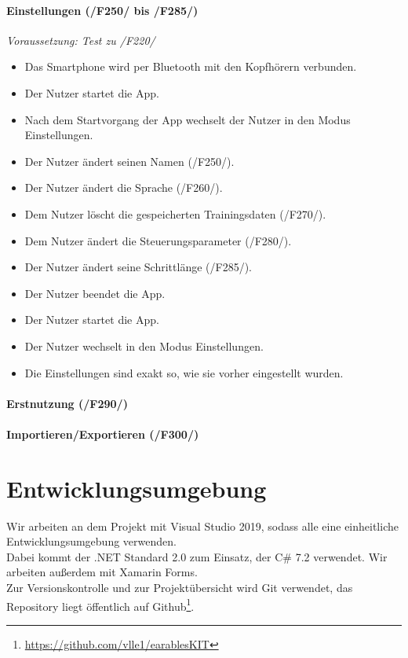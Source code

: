 \documentclass[a4paper,12pt]{article}
\begin{document}
      \paragraph{Einstellungen (/F250/ bis /F285/)}
      \textit{Voraussetzung: Test zu /F220/}
      \begin{itemize}
        \item[] Das Smartphone wird per Bluetooth mit den Kopfhörern verbunden.
        \item[] Der Nutzer startet die App.
        \item[] Nach dem Startvorgang der App wechselt der Nutzer in den Modus \glqq Einstellungen\grqq .
        \item[] Der Nutzer ändert seinen Namen (/F250/).
        \item[] Der Nutzer ändert die Sprache (/F260/).
        \item[] Dem Nutzer löscht die gespeicherten Trainingsdaten (/F270/).
        \item[] Dem Nutzer ändert die Steuerungsparameter (/F280/).
        \item[] Der Nutzer ändert seine Schrittlänge (/F285/).
        \item[] Der Nutzer beendet die App.
        \item[] Der Nutzer startet die App.
        \item[] Der Nutzer wechselt in den Modus \glqq Einstellungen\grqq .
        \item[] Die Einstellungen sind exakt so, wie sie vorher eingestellt wurden.
      \end{itemize}

      \paragraph{Erstnutzung (/F290/)}

      \paragraph{Importieren/Exportieren (/F300/)}




\section{Entwicklungsumgebung}
Wir arbeiten an dem Projekt mit Visual Studio 2019, sodass alle eine einheitliche Entwicklungsumgebung verwenden.\\
Dabei kommt der .NET Standard 2.0 zum Einsatz, der C\# 7.2 verwendet. Wir arbeiten außerdem mit Xamarin Forms.\\
Zur Versionskontrolle und zur Projektübersicht wird Git verwendet, das Repository liegt öffentlich auf Github\footnote{\url{https://github.com/vlle1/earablesKIT}}.
\clearpage
\printglossaries
{}
\end{document}
